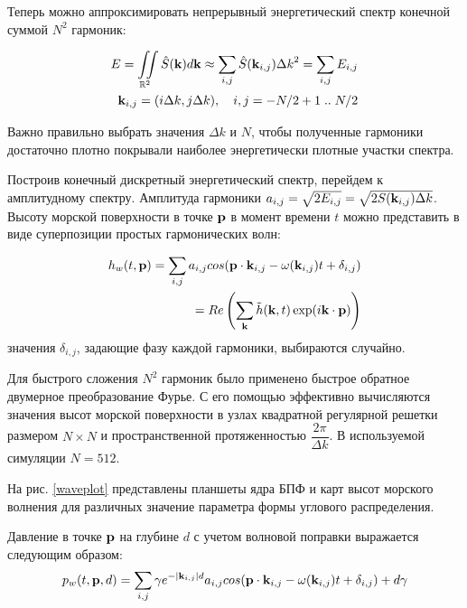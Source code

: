 Теперь можно аппроксимировать непрерывный энергетический спектр конечной суммой $N^2$ гармоник:

\begin{equation}
\label{longe-higgins}
\begin{split}
E = \iint\limits_{\mathbb{R}^2} \hat{S}(\mathbf{k})d\mathbf{k}
    \approx \sum_{i,j} \hat{S}(\mathbf{k}_{i,j}) {\Delta k}^2 
    = \sum_{i,j} E_{i,j}\\
\mathbf{k}_{i,j} = (i\Delta k, j\Delta k), \quad i,j = -N/2+1 \; .. \; N/2 
\end{split}
\end{equation}

Важно правильно выбрать значения $\Delta k$ и $N$, чтобы полученные гармоники достаточно плотно покрывали наиболее энергетически плотные участки спектра.

Построив конечный дискретный энергетический спектр, перейдем к амплитудному спектру. Амплитуда гармоники $a_{i,j} = \sqrt{2E_{i,j}} = \sqrt{2S(\mathbf{k}_{i,j})\Delta k}$. Высоту морской поверхности в точке $\mathbf{p}$ в момент времени $t$ можно представить в виде суперпозиции простых гармонических волн:

\begin{equation}
\label{wave_height}
\begin{split}
h_w(t,\mathbf{p}) = \sum_{i,j} a_{i,j}cos(\mathbf{p}\cdot \mathbf{k}_{i,j} - \omega(\mathbf{k}_{i,j})t + \delta_{i,j}) \\
= Re\left( \sum_{\mathbf{k}} \tilde{h}(\mathbf{k}, t)
 \exp(i\mathbf{k} \cdot \mathbf{p}) \right)
\end{split}
\end{equation}
значения $\delta_{i,j}$, задающие фазу каждой гармоники, выбираются случайно.

Для быстрого сложения $N^2$ гармоник было применено быстрое обратное двумерное преобразование Фурье. С его помощью эффективно вычисляются значения высот морской поверхности в узлах квадратной регулярной решетки размером $N \times N$ и пространственной протяженностью $\dfrac{2\pi}{\Delta k}$. В используемой симуляции $N = 512$.

На рис. \ref{waveplot} представлены планшеты ядра БПФ и карт высот морского волнения для различных значение параметра формы углового распределения.

Давление в точке $\mathbf{p}$ на глубине $d$ с учетом волновой поправки выражается следующим образом:
\begin{equation}
\label{wave_height}
	p_w(t,\mathbf{p},d) = \sum_{i,j}
		\gamma e^{-\lvert\mathbf{k}_{i,j}\rvert d} 
		a_{i,j}cos(\mathbf{p}\cdot \mathbf{k}_{i,j} 
		- \omega(\mathbf{k}_{i,j})t 
		+ \delta_{i,j}) + d \gamma
\end{equation}

